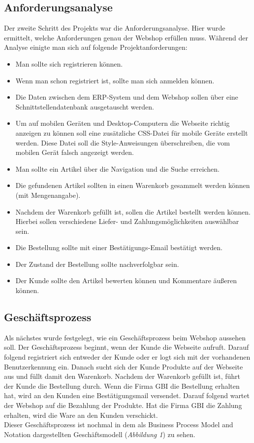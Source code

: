 \subsection{Anforderungsanalyse}
Der zweite Schritt des Projekts war die Anforderungsanalyse. Hier wurde ermittelt, welche Anforderungen genau der Webshop erfüllen muss. Während der Analyse einigte man sich auf folgende Projektanforderungen:
\begin{itemize}
	\item Man sollte sich registrieren können.
	\item Wenn man schon registriert ist, sollte man sich anmelden können.
	\item Die Daten zwischen dem ERP-System und dem Webshop sollen über eine Schnittstellendatenbank ausgetauscht werden.
	\item Um auf mobilen Geräten und Desktop-Computern die Webseite richtig anzeigen zu können soll eine zusätzliche CSS-Datei für mobile Geräte erstellt werden. Diese Datei soll die Style-Anweisungen überschreiben, die vom mobilen Gerät falsch angezeigt werden.
	\item Man sollte ein Artikel über die Navigation und die Suche erreichen.
	\item Die gefundenen Artikel sollten in einen Warenkorb gesammelt werden können (mit Mengenangabe).
	\item Nachdem der Warenkorb gefüllt ist, sollen die Artikel bestellt werden können. Hierbei sollen verschiedene Liefer- und Zahlungsmöglichkeiten auswählbar sein.
	\item Die Bestellung sollte mit einer Bestätigungs-Email bestätigt werden.
	\item Der Zustand der Bestellung sollte nachverfolgbar sein.
	\item Der Kunde sollte den Artikel bewerten können und Kommentare äußeren können.
\end{itemize}

\subsection{Geschäftsprozess}
Als nächstes wurde festgelegt, wie ein Geschäftsprozess beim Webshop aussehen soll. Der Geschäftsprozess beginnt, wenn der Kunde die Webseite aufruft. Darauf folgend registriert sich entweder der Kunde oder er logt sich mit der vorhandenen Benutzerkennung ein. Danach sucht sich der Kunde Produkte auf der Webseite aus und füllt damit den Warenkorb. Nachdem der Warenkorb gefüllt ist, führt der Kunde die Bestellung durch. Wenn die Firma GBI die  Bestellung erhalten hat, wird an den Kunden eine Bestätigungsmail versendet. Darauf folgend wartet der Webshop auf die Bezahlung der Produkte. Hat die Firma GBI die Zahlung erhalten,  wird die Ware an den Kunden verschickt. \\Dieser Geschäftsprozess ist nochmal in dem als \glqq Business Process Model and Notation\grqq{} dargestellten Geschäftsmodell (\textit{Abbildung 1}) zu sehen.

